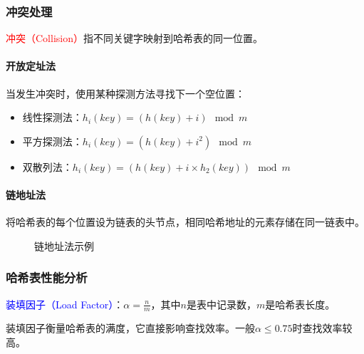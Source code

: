 \documentclass{../../note}
\begin{document}
\subsubsection{冲突处理}
\textcolor{red}{冲突（Collision）}指不同关键字映射到哈希表的同一位置。

\paragraph{开放定址法}
当发生冲突时，使用某种探测方法寻找下一个空位置：
\begin{itemize}
  \item 线性探测法：$h_i(key) = (h(key) + i) \mod m$
  \item 平方探测法：$h_i(key) = (h(key) + i^2) \mod m$
  \item 双散列法：$h_i(key) = (h(key) + i \times h_2(key)) \mod m$
\end{itemize}

\paragraph{链地址法}
将哈希表的每个位置设为链表的头节点，相同哈希地址的元素存储在同一链表中。

\begin{figure}[h]
  \centering
  \caption{链地址法示例}
\end{figure}

\subsubsection{哈希表性能分析}

\textcolor{blue}{装填因子（Load Factor）}：$\alpha = \frac{n}{m}$，其中$n$是表中记录数，$m$是哈希表长度。

装填因子衡量哈希表的满度，它直接影响查找效率。一般$\alpha \leq 0.75$时查找效率较高。
\end{document}
